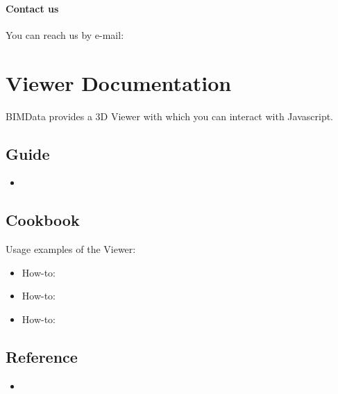 \documentclass[a4paper,12pt,english]{sphinxmanual}
\begin{document}
\subsubsection{Contact us}
\label{\detokenize{get_help:contact-us}}
You can reach us by e-mail: 


\chapter{Viewer Documentation}
\label{\detokenize{viewer/index:viewer-documentation}}\label{\detokenize{viewer/index::doc}}
BIMData provides a 3D Viewer with which you can interact with Javascript.

{\hyperref[\detokenize{viewer/getting_started::doc}]{}}


\section{Guide}
\label{\detokenize{viewer/index:guide}}\begin{itemize}
\item {} 
{\hyperref[\detokenize{viewer/include_viewer::doc}]{}}

\end{itemize}


\section{Cookbook}
\label{\detokenize{viewer/index:cookbook}}
Usage examples of the Viewer:
\begin{itemize}
\item {} 
How-to: {\hyperref[\detokenize{viewer/init_viewer::doc}]{}}

\item {} 
How-to: {\hyperref[\detokenize{viewer/example_doors::doc}]{}}

\item {} 
How-to: {\hyperref[\detokenize{viewer/viewfit_focus::doc}]{}}

\end{itemize}


\section{Reference}
\label{\detokenize{viewer/index:reference}}\begin{itemize}
\item {} 
{\hyperref[\detokenize{viewer/parameters::doc}]{}}

\end{itemize}
\end{document}

